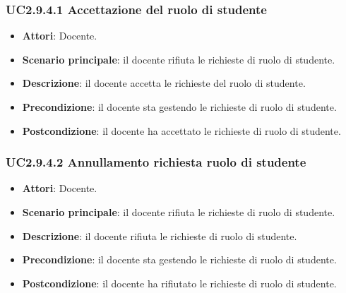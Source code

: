 \subsubsection{UC2.9.4.1 Accettazione del ruolo di studente}
\begin{itemize}
\item \textbf{Attori}: Docente.
\item \textbf{Scenario principale}: il docente rifiuta le richieste di ruolo di studente.
\item \textbf{Descrizione}: il docente accetta le richieste del ruolo di studente.
\item \textbf{Precondizione}: il docente sta gestendo le richieste di ruolo di studente.
\item \textbf{Postcondizione}: il docente ha accettato le richieste di ruolo di studente.
\end{itemize}
\subsubsection{UC2.9.4.2 Annullamento richiesta ruolo di studente}
\begin{itemize}
\item \textbf{Attori}: Docente.
\item \textbf{Scenario principale}: il docente rifiuta le richieste di ruolo di studente.
\item \textbf{Descrizione}: il docente rifiuta le richieste di ruolo di studente.
\item \textbf{Precondizione}: il docente sta gestendo le richieste di ruolo di studente.
\item \textbf{Postcondizione}: il docente ha rifiutato le richieste di ruolo di studente.
\end{itemize}

